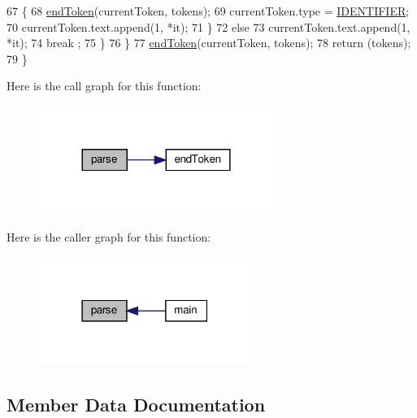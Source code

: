 \begin{DoxyCode}
67                     \{
68                         \hyperlink{classft_1_1_tokenizer_a4d9a98ce2e5ef728cfa5a68c8f726587}{endToken}(currentToken, tokens);
69                         currentToken.type = \hyperlink{namespaceft_aa520fbf142ba1e7e659590c07da31921a84f8ae2490f9e4bd2321fd21f4b0e807}{IDENTIFIER};
70                         currentToken.text.append(1, *it);
71                     \}
72                     \textcolor{keywordflow}{else} 
73                         currentToken.text.append(1, *it);
74                     break ;
75             \}
76         \}
77         \hyperlink{classft_1_1_tokenizer_a4d9a98ce2e5ef728cfa5a68c8f726587}{endToken}(currentToken, tokens);
78         \textcolor{keywordflow}{return} (tokens);
79     \}
\end{DoxyCode}
Here is the call graph for this function\+:
\nopagebreak
\begin{figure}[H]
\begin{center}
\leavevmode
\includegraphics[width=216pt]{classft_1_1_tokenizer_a10bacfc70f3d74a0e04218c1df86f6c2_cgraph}
\end{center}
\end{figure}
Here is the caller graph for this function\+:
\nopagebreak
\begin{figure}[H]
\begin{center}
\leavevmode
\includegraphics[width=195pt]{classft_1_1_tokenizer_a10bacfc70f3d74a0e04218c1df86f6c2_icgraph}
\end{center}
\end{figure}


\subsection{Member Data Documentation}
\mbox{\label{classft_1_1_tokenizer_a942c5b794d108f144c5b5028aaa34cb6}} 
